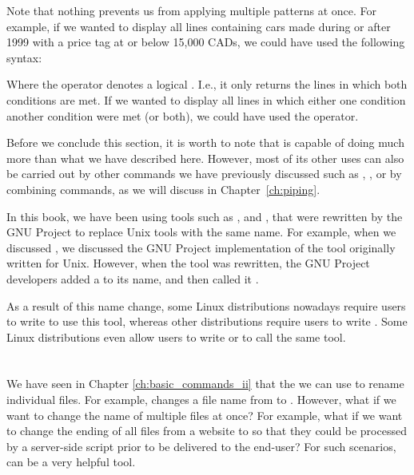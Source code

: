 Note that nothing prevents us from applying multiple patterns at once. For example, if we wanted to display all lines containing cars made during or after 1999 with a price tag at or below 15,000 CADs, we could have used the following syntax:


Where the \mycommand{\&\&} operator denotes a logical . I.e., it only returns the lines in which both conditions are met. If we wanted to display all lines in which either one condition  another condition were met (or both), we could have used the \mycommand{||} operator.

Before we conclude this section, it is worth to note that  is capable of doing much more than what we have described here. However, most of its other uses can also be carried out by other commands we have previously discussed such as , , or by combining commands, as we will discuss in Chapter~\ref{ch:piping}.

\begin{my_box}
In this book, we have been using tools such as , and , that were rewritten by the GNU Project to replace Unix tools with the same name. For example, when we discussed , we discussed the GNU Project implementation of the  tool originally written for Unix. However, when the  tool was rewritten, the GNU Project developers added a  to its name, and then called it .

As a result of this name change, some Linux distributions nowadays require users to write  to use this tool, whereas other distributions require users to write . Some Linux distributions even allow users to write  or  to call the same tool.
\end{my_box}

\section{}

We have seen in Chapter \ref{ch:basic_commands_ii} that the we can use  to rename individual files. For example,  changes a file name from  to . However, what if we want to change the name of multiple files at once? For example, what if we want to change the ending of all  files from a website to  so that they could be processed by a server-side script prior to be delivered to the end-user? For such scenarios,  can be a very helpful tool.

